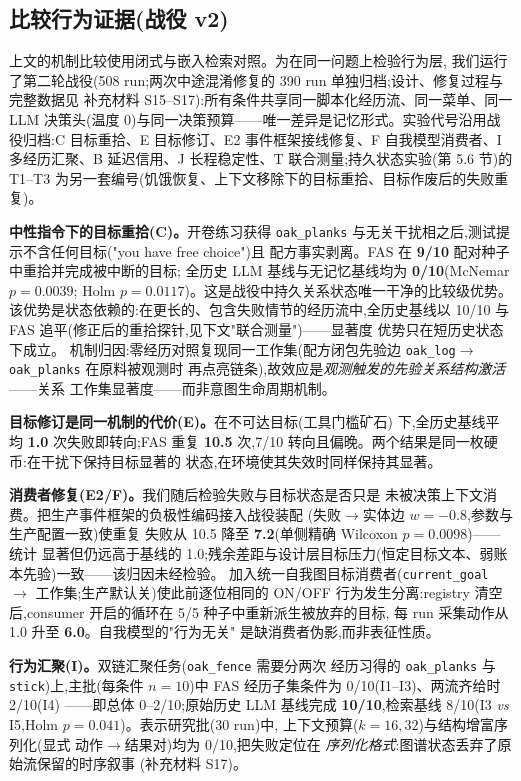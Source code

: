 \documentclass[10pt,a4paper]{ctexart}
\begin{document}
\subsection{比较行为证据(战役 v2)}
\label{sec:res-campaign}

上文的机制比较使用闭式与嵌入检索对照。为在同一问题上检验行为层,
我们运行了第二轮战役(508 run;两次中途混淆修复的 390 run 单独归档;设计、修复过程与完整数据见
补充材料 S15--S17):所有条件共享同一脚本化经历流、同一菜单、同一
LLM 决策头(温度 0)与同一决策预算——唯一差异是记忆形式。实验代号沿用战役归档:C 目标重拾、E 目标修订、E2 事件框架接线修复、F 自我模型消费者、I 多经历汇聚、B 延迟信用、J 长程稳定性、T 联合测量;持久状态实验(第 5.6 节)的 T1--T3 为另一套编号(饥饿恢复、上下文移除下的目标重拾、目标作废后的失败重复)。

\textbf{中性指令下的目标重拾(C)。}开卷练习获得 \texttt{oak\_planks}
与无关干扰相之后,测试提示不含任何目标("you have free choice")且
配方事实剥离。FAS 在 \textbf{9/10} 配对种子中重拾并完成被中断的目标;
全历史 LLM 基线与无记忆基线均为 \textbf{0/10}(McNemar $p{=}0.0039$;
Holm $p{=}0.0117$)。这是战役中持久关系状态唯一干净的比较级优势。
该优势是状态依赖的:在更长的、包含失败情节的经历流中,全历史基线以
10/10 与 FAS 追平(修正后的重拾探针,见下文"联合测量")——显著度
优势只在短历史状态下成立。
机制归因:零经历对照复现同一工作集(配方闭包先验边
\texttt{oak\_log}$\rightarrow$\texttt{oak\_planks} 在原料被观测时
再点亮链条),故效应是\emph{观测触发的先验关系结构激活}——关系
工作集显著度——而非意图生命周期机制。

\textbf{目标修订是同一机制的代价(E)。}在不可达目标(工具门槛矿石)
下,全历史基线平均 \textbf{1.0} 次失败即转向;FAS 重复 \textbf{10.5}
次,7/10 转向且偏晚。两个结果是同一枚硬币:在干扰下保持目标显著的
状态,在环境使其失效时同样保持其显著。

\textbf{消费者修复(E2/F)。}我们随后检验失败与目标状态是否只是
未被决策上下文消费。把生产事件框架的负极性编码接入战役装配
(失败$\rightarrow$实体边 $w{=}{-}0.8$,参数与生产配置一致)使重复
失败从 10.5 降至 \textbf{7.2}(单侧精确 Wilcoxon $p{=}0.0098$)——统计
显著但仍远高于基线的 1.0;残余差距与设计层目标压力(恒定目标文本、弱账本先验)一致——该归因未经检验。
加入统一自我图目标消费者(\texttt{current\_goal} $\rightarrow$
工作集;生产默认关)使此前逐位相同的 ON/OFF 行为发生分离:registry
清空后,consumer 开启的循环在 5/5 种子中重新派生被放弃的目标,
每 run 采集动作从 1.0 升至 \textbf{6.0}。自我模型的"行为无关"
是缺消费者伪影,而非表征性质。

\textbf{行为汇聚(I)。}双链汇聚任务(\texttt{oak\_fence} 需要分两次
经历习得的 \texttt{oak\_planks} 与 \texttt{stick})上,主批(每条件
$n{=}10$)中 FAS 经历子集条件为 0/10(I1--I3)、两流齐给时 2/10(I4)
——即总体 0--2/10;原始历史 LLM 基线完成 \textbf{10/10},检索基线
8/10(I3 \emph{vs} I5,Holm $p{=}0.041$)。表示研究批(30 run)中,
上下文预算($k{=}16,32$)与结构增富序列化(显式
动作$\rightarrow$结果对)均为 0/10,把失败定位在
\emph{序列化格式}:图谱状态丢弃了原始流保留的时序叙事
(补充材料 S17)。
\end{document}
